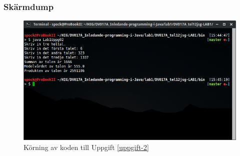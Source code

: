 \subsubsection{Skärmdump}
\begin{figure}[htbp]
    \centering
        \includegraphics[width=\linewidth]{img/02.png}
    \caption{Körning av koden till Uppgift \ref{uppgift-2}}
    \label{fig:screenshot-02}
\end{figure}
